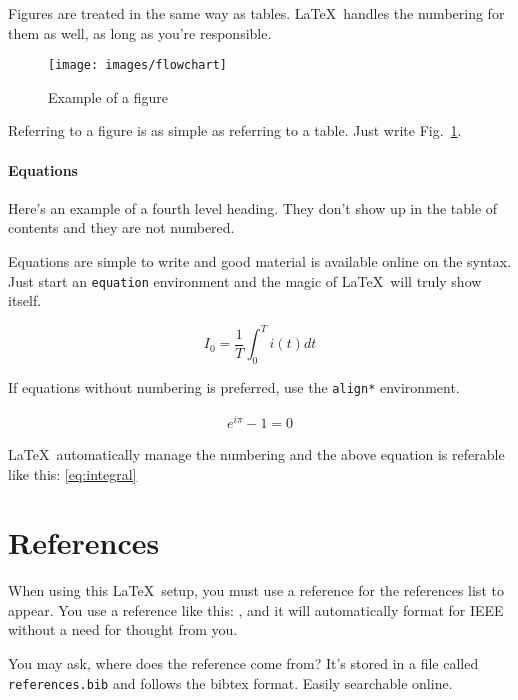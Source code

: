 Figures are treated in the same way as tables. \LaTeX\, handles the
numbering for them as well, as long as you're responsible.

\begin{figure}[ht!]
    \centering
    \texttt{[image: images/flowchart]}
    \caption{Example of a figure}
    \label{fig:example}
\end{figure}

Referring to a figure is as simple as referring to a table. Just
write Fig.~\ref{fig:example}.

\paragraph{Equations}
Here's an example of a fourth level heading. They don't show up in
the table of contents and they are not numbered.

Equations are simple to write and good material is available online
on the syntax. Just start an \verb|equation| environment and the
magic of \LaTeX\, will truly show itself.

\begin{equation}
    \label{eq:integral}
    I_0 = \frac{1}{T}\int_0^T i(t)dt
\end{equation}

If equations without numbering is preferred, use the \verb|align*|
environment.

\begin{align*}
    e^{i\pi}-1=0
\end{align*}

\LaTeX\, automatically manage the numbering and the above equation
is referable like this: \ref{eq:integral}

\section{References}
When using this \LaTeX\, setup, you must use a reference for the
references list to appear. You use a reference like this:
\cite{IEEE2022}, and it will automatically format for IEEE without
a need for thought from you. 

You may ask, where does the reference come from? It's stored in a
file called \verb|references.bib| and follows the bibtex format.
Easily searchable online.
